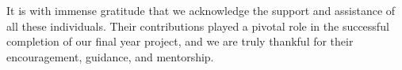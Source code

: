 \documentclass[12pt]{report}
\begin{document}
It is with immense gratitude that we acknowledge the support and assistance of all these individuals. Their contributions played a pivotal role in the successful completion of our final year project, and we are truly thankful for their encouragement, guidance, and mentorship.

\newpage

\tableofcontents
\listoffigures
\listoftables
\newpage
\printacronyms
\newpage











% 







\end{document}
